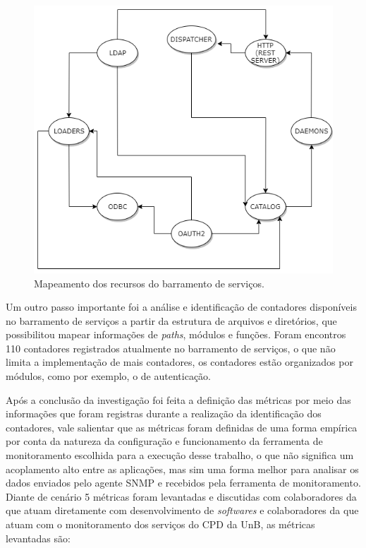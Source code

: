 {\begin{figure}[h!]
	\begin{center}
	\includegraphics[scale = 0.70]{img/ResourcesEMS.png}
	\caption{Mapeamento dos recursos do barramento de serviços.}
	\label{fun:fig:ResourcesEMS}
	\end{center}
\end{figure}

Um outro passo importante foi a análise e identificação de contadores disponíveis no barramento de serviços a partir da estrutura de arquivos e diretórios, que possibilitou mapear informações de \textit{paths}, módulos e funções. Foram encontros 110 contadores registrados atualmente no barramento de serviços, o que não limita a implementação de mais contadores, os contadores estão organizados por módulos, como por exemplo, o de autenticação.  

Após a conclusão da investigação foi feita a definição das métricas por meio das informações que foram registras durante a realização da identificação dos contadores, vale salientar que as métricas foram definidas de uma forma empírica por conta da natureza da configuração e funcionamento da ferramenta de monitoramento escolhida para a execução desse trabalho, o que não significa um acoplamento alto entre as aplicações, mas sim uma forma melhor para analisar os dados enviados pelo agente \acrshort{SNMP} e recebidos pela ferramenta de monitoramento. Diante de cenário 5 métricas foram levantadas e discutidas com colaboradores da que atuam diretamente com desenvolvimento de  \textit{softwares} e colaboradores da que atuam com o monitoramento dos serviços do \acrshort{CPD} da \acrshort{UnB}, as métricas levantadas são: 

}
